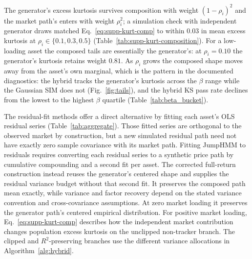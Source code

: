 The generator's excess kurtosis survives composition with weight
$(1 - \rho_i)^2$ and the market path's enters with weight $\rho_i^2$;
a simulation check with independent generator draws matched
Eq.~\eqref{eq:supp-kurt-comp} to within $0.03$ in mean excess
kurtosis at $\rho_i \in \{0.1, 0.3, 0.5\}$
(Table~\ref{tab:supp-kurt-composition}). For a low-loading asset
the composed tails are essentially the generator's: at
$\rho_i = 0.10$ the generator's kurtosis retains weight $0.81$. As
$\rho_i$ grows the composed shape moves away from the asset's own
marginal, which is the pattern in the documented diagnostics: the
hybrid tracks the generator's kurtosis across the $\beta$ range while
the Gaussian SIM does not (Fig.~\ref{fig:tails}), and the hybrid KS
pass rate declines from the lowest to the highest $\beta$ quartile
(Table~\ref{tab:beta_bucket}).

The residual-fit methods offer a direct alternative by fitting each
asset's OLS residual series (Table~\ref{tab:aggregate}). Those fitted
series are orthogonal to the observed market by construction, but a
new simulated residual path need not have exactly zero sample
covariance with its market path. Fitting JumpHMM to residuals requires
converting each residual series to a synthetic price path by
cumulative compounding and a second fit per asset. The corrected
full-return construction instead reuses the generator's centered
shape and supplies the residual variance budget without that second
fit. It preserves the composed path mean exactly, while variance and
factor recovery depend on the stated variance convention and
cross-covariance assumptions. At zero market loading it preserves the
generator path's centered empirical distribution. For positive market
loading, Eq.~\eqref{eq:supp-kurt-comp} describes how the independent
market contribution changes population excess kurtosis on the
unclipped non-tracker branch. The clipped and $R^2$-preserving branches
use the different variance allocations in Algorithm~\ref{alg:hybrid}.

\begin{table}[H]
\centering
\caption{\textbf{Simulation check of the kurtosis composition rule.}
    For each variance share $\rho_i$, $200$ pairs of independent
    in-sample-length generator paths were standardized and combined
    as $\sqrt{\rho_i}\, x + \sqrt{1 - \rho_i}\, y$. The predicted
    column evaluates Eq.~\eqref{eq:supp-kurt-comp} with each pair's
    sample excess kurtosis; the simulated column is the sample excess
    kurtosis of the combined series. Both are averaged over the $200$
    pairs.}
\label{tab:supp-kurt-composition}
\small

\end{table}


